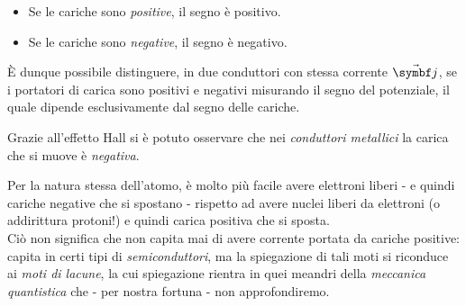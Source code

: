 \begin{itemize}
	\item Se le cariche sono \textit{positive}, il segno è positivo.
	\item Se le cariche sono \textit{negative}, il segno è negativo.
\end{itemize}
È dunque possibile distinguere, in due conduttori con stessa corrente $\vba{j}$, se i portatori di carica sono positivi e negativi misurando il segno del potenziale, il quale dipende esclusivamente dal segno delle cariche.
\begin{example}
	Grazie all'effetto Hall si è potuto osservare che nei \textit{conduttori metallici} la carica che si muove è \textit{negativa}.
\end{example}
\begin{digression}
	Per la natura stessa dell'atomo, è molto più facile avere elettroni liberi - e quindi cariche negative che si spostano - rispetto ad avere nuclei liberi da elettroni (o addirittura protoni!) e quindi carica positiva che si sposta.\\
	Ciò non significa che non capita mai di avere corrente portata da cariche positive: capita in certi tipi di \textit{semiconduttori}, ma la spiegazione di tali moti si riconduce ai \textit{moti di lacune}, la cui spiegazione rientra in quei meandri della \textit{meccanica quantistica} che - per nostra fortuna - non approfondiremo. 
\end{digression}

